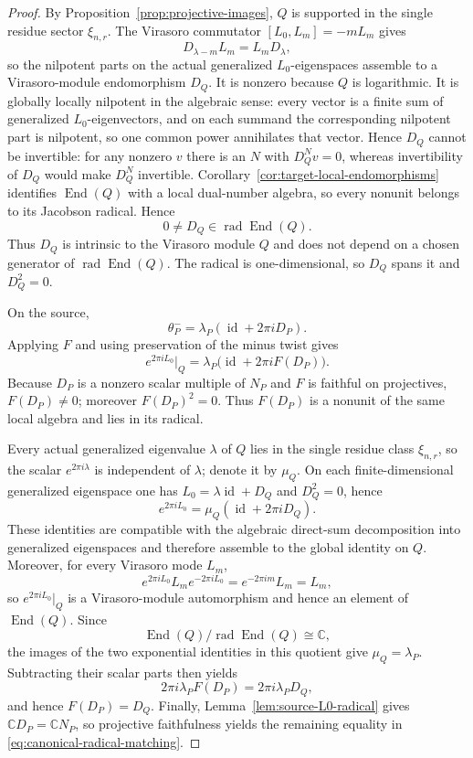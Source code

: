 \documentclass[12pt,leqno]{amsart}
\numberwithin{equation}{section}
\newcommand{\End}{\operatorname{End}}
\newcommand{\rad}{\operatorname{rad}}
\newcommand{\id}{\operatorname{id}}
\def\C{\mathbb{C}}
\begin{document}
\begin{proof}
By Proposition~\ref{prop:projective-images}, $Q$ is supported in the
single residue sector $\xi_{n,r}$.  The Virasoro commutator
$[L_0,L_m]=-mL_m$ gives
\[
 D_{\lambda-m}L_m=L_mD_\lambda,
\]
so the nilpotent parts on the actual generalized $L_0$-eigenspaces
assemble to a Virasoro-module endomorphism $D_Q$.  It is nonzero because $Q$ is logarithmic.  It is globally locally
nilpotent in the algebraic sense: every vector is a finite sum of
generalized $L_0$-eigenvectors, and on each summand the corresponding
nilpotent part is nilpotent, so one common power annihilates that vector.
Hence $D_Q$ cannot be invertible: for any nonzero $v$ there is an $N$
with $D_Q^Nv=0$, whereas invertibility of $D_Q$ would make $D_Q^N$
invertible.
Corollary~\ref{cor:target-local-endomorphisms} identifies $\End(Q)$ with a
local dual-number algebra, so every nonunit belongs to its Jacobson
radical.  Hence
\[
 0\ne D_Q\in\rad\End(Q).
\]
Thus $D_Q$ is intrinsic to the Virasoro module $Q$ and does not depend on
a chosen generator of $\rad\End(Q)$.  The radical is one-dimensional,
so $D_Q$ spans it and $D_Q^2=0$.

On the source,
\[
 \theta^-_P=\lambda_P(\id+2\pi iD_P).
\]
Applying $F$ and using preservation of the minus twist gives
\[
 e^{2\pi iL_0}|_Q
 =\lambda_P\bigl(\id+2\pi iF(D_P)\bigr).
\]
Because $D_P$ is a nonzero scalar multiple of $N_P$ and $F$ is faithful on
projectives, $F(D_P)\ne0$; moreover $F(D_P)^2=0$.  Thus $F(D_P)$ is a
nonunit of the same local algebra and lies in its radical.

Every actual generalized eigenvalue $\lambda$ of $Q$ lies in the single
residue class $\xi_{n,r}$, so the scalar $e^{2\pi i\lambda}$ is independent
of $\lambda$; denote it by $\mu_Q$.  On each finite-dimensional generalized
eigenspace one has $L_0=\lambda\id+D_Q$ and $D_Q^2=0$, hence
\[
 e^{2\pi iL_0}=\mu_Q(\id+2\pi iD_Q).
\]
These identities are compatible with the algebraic direct-sum
decomposition into generalized eigenspaces and therefore assemble to the
global identity on $Q$.  Moreover, for every Virasoro mode $L_m$,
\[
 e^{2\pi iL_0}L_me^{-2\pi iL_0}=e^{-2\pi im}L_m=L_m,
\]
so $e^{2\pi iL_0}|_Q$ is a Virasoro-module automorphism and hence an
element of $\End(Q)$.  Since
\[
 \End(Q)/\rad\End(Q)\cong\C,
\]
the images of the two exponential identities in this quotient give
$\mu_Q=\lambda_P$.  Subtracting their scalar
parts then yields
\[
 2\pi i\lambda_PF(D_P)=2\pi i\lambda_PD_Q,
\]
and hence $F(D_P)=D_Q$.  Finally,
Lemma~\ref{lem:source-L0-radical} gives $\C D_P=\C N_P$, so projective
faithfulness yields the remaining equality in
\eqref{eq:canonical-radical-matching}.
\end{proof}
\end{document}
